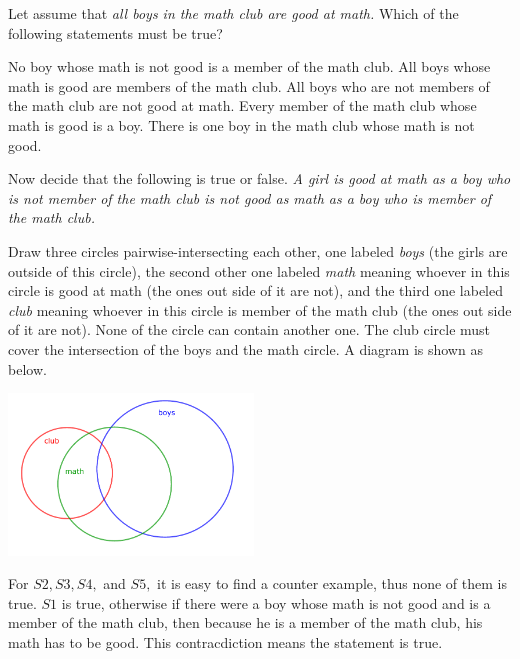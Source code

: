 \documentclass{article}
\begin{document}
\begin{exercise*}

    Let assume that \textit{all boys in the math club are good at math.} 
    Which of the following statements must be true?
    \begin{enumerate}[topsep=0pt, partopsep=0pt, itemsep=0pt]
        \ii[S1.] No boy whose math is not good is a member of the math club.
        \ii[S2.] All boys whose math is good are members of the math club.
        \ii[S3.] All boys who are not members of the math club are not good at math.
        \ii[S4.] Every member of the math club whose math is good is a boy.
        \ii[S5.] There is one boy in the math club whose math is not good.
    \end{enumerate}

	Now decide that the following is true or false.
    \textit{A girl is good at math as a boy who is not member of the math club is not good as math as a boy who is member of the math club.}
\end{exercise*}

\begin{soln}
    Draw three circles pairwise-intersecting each other, one labeled \textit{boys} (the girls are outside of this circle),
    the second other one labeled \textit{math} meaning whoever in this circle is good at math (the ones out side of it are not),
    and the third one labeled \textit{club} meaning whoever in this circle is member of the math club (the ones out side of it are not).
    None of the circle can contain another one. The club circle must cover the intersection of the boys and the math circle.
    A diagram is shown as below.

    \begin{center}
        \includegraphics[width=6.5cm]{./svg/pdf/pi-2023-01-04.pdf}
    \end{center}

    For $S2,S3, S4,$ and $S5,$ it is easy to find a counter example, thus none of them is true.
    $S1$ is true, otherwise if there were a boy whose math is not good and is a member of the math club,
    then because he is a member of the math club, his math has to be good. This contracdiction means the statement is true.
\end{soln}
\end{document}
